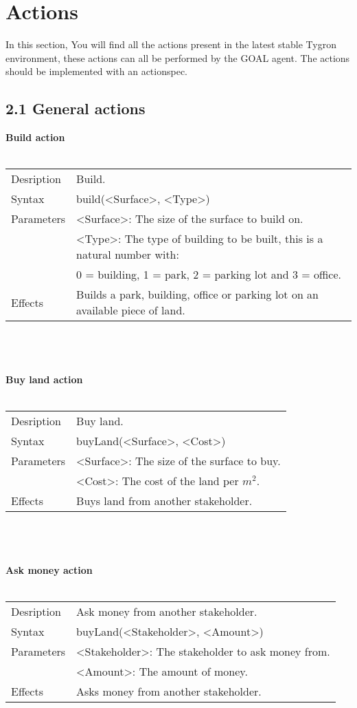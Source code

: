 \documentclass[english,11pt]{report}
\begin{document}
\chapter{Actions}

In this section, You will find all the actions present in the latest stable Tygron environment, these actions can all be performed by the GOAL agent. The actions should be implemented with an actionspec.

\newpage
\section*{2.1 General actions}

\textbf{Build action}\\
\\
\begin{tabularx}{\textwidth}{lX}
 Desription & Build. \\
 Syntax & build(<Surface>, <Type>) \\
 Parameters & <Surface>: The size of the surface to build on.\\
            & <Type>: The type of building to be built, this is a natural number with: \\
            &      0 = building, 1 = park, 2 = parking lot and 3 = office.\\
 Effects &  Builds a park, building, office or parking lot on an available piece of land.
\end{tabularx}\\
\\
\\
\textbf{Buy land action}\\
\\
\begin{tabularx}{\textwidth}{lX}
 Desription & Buy land. \\
 Syntax & buyLand(<Surface>, <Cost>) \\
 Parameters & <Surface>: The size of the surface to buy.\\
            & <Cost>: The cost of the land per $m^2$.\\
 Effects &  Buys land from another stakeholder.
\end{tabularx}\\
\\
\\
\textbf{Ask money action}\\
\\
\begin{tabularx}{\textwidth}{lX}
 Desription & Ask money from another stakeholder. \\
 Syntax & buyLand(<Stakeholder>, <Amount>) \\
 Parameters & <Stakeholder>: The stakeholder to ask money from.\\
            & <Amount>: The amount of money.\\
 Effects &  Asks money from another stakeholder.
\end{tabularx}\\
\end{document}

